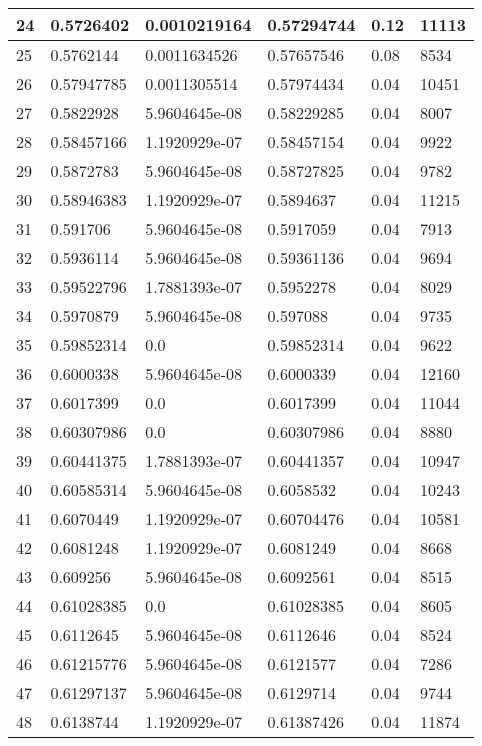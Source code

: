 \begin{longtable}{|l|l|l|l|l|l|}
24 & 0.5726402 & 0.0010219164 & 0.57294744 & 0.12 & 11113 \\ \hline 
25 & 0.5762144 & 0.0011634526 & 0.57657546 & 0.08 & 8534 \\ \hline 
26 & 0.57947785 & 0.0011305514 & 0.57974434 & 0.04 & 10451 \\ \hline 
27 & 0.5822928 & 5.9604645e-08 & 0.58229285 & 0.04 & 8007 \\ \hline 
28 & 0.58457166 & 1.1920929e-07 & 0.58457154 & 0.04 & 9922 \\ \hline 
29 & 0.5872783 & 5.9604645e-08 & 0.58727825 & 0.04 & 9782 \\ \hline 
30 & 0.58946383 & 1.1920929e-07 & 0.5894637 & 0.04 & 11215 \\ \hline 
31 & 0.591706 & 5.9604645e-08 & 0.5917059 & 0.04 & 7913 \\ \hline 
32 & 0.5936114 & 5.9604645e-08 & 0.59361136 & 0.04 & 9694 \\ \hline 
33 & 0.59522796 & 1.7881393e-07 & 0.5952278 & 0.04 & 8029 \\ \hline 
34 & 0.5970879 & 5.9604645e-08 & 0.597088 & 0.04 & 9735 \\ \hline 
35 & 0.59852314 & 0.0 & 0.59852314 & 0.04 & 9622 \\ \hline 
36 & 0.6000338 & 5.9604645e-08 & 0.6000339 & 0.04 & 12160 \\ \hline 
37 & 0.6017399 & 0.0 & 0.6017399 & 0.04 & 11044 \\ \hline 
38 & 0.60307986 & 0.0 & 0.60307986 & 0.04 & 8880 \\ \hline 
39 & 0.60441375 & 1.7881393e-07 & 0.60441357 & 0.04 & 10947 \\ \hline 
40 & 0.60585314 & 5.9604645e-08 & 0.6058532 & 0.04 & 10243 \\ \hline 
41 & 0.6070449 & 1.1920929e-07 & 0.60704476 & 0.04 & 10581 \\ \hline 
42 & 0.6081248 & 1.1920929e-07 & 0.6081249 & 0.04 & 8668 \\ \hline 
43 & 0.609256 & 5.9604645e-08 & 0.6092561 & 0.04 & 8515 \\ \hline 
44 & 0.61028385 & 0.0 & 0.61028385 & 0.04 & 8605 \\ \hline 
45 & 0.6112645 & 5.9604645e-08 & 0.6112646 & 0.04 & 8524 \\ \hline 
46 & 0.61215776 & 5.9604645e-08 & 0.6121577 & 0.04 & 7286 \\ \hline 
47 & 0.61297137 & 5.9604645e-08 & 0.6129714 & 0.04 & 9744 \\ \hline 
48 & 0.6138744 & 1.1920929e-07 & 0.61387426 & 0.04 & 11874 \\ \hline 

\end{longtable}
